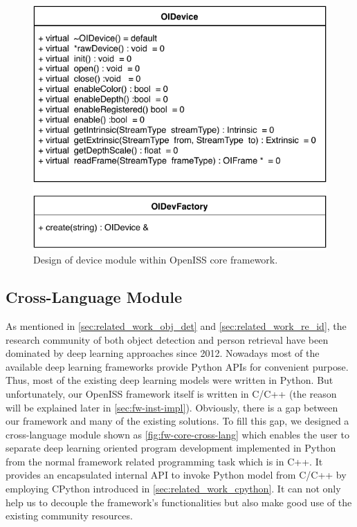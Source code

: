 \begin{figure}
    \centering
    \includegraphics[scale=0.8]{figures/framework_core_device.pdf}
    \caption{Design of device module within OpenISS core framework.}
    \label{fig:fw-core-device}
\end{figure}

\subsection{Cross-Language Module}
\label{sec:fw-design-core-cross-lang}

As mentioned in \autoref{sec:related_work_obj_det} and
\autoref{sec:related_work_re_id}, the research community of both 
object detection and person retrieval have been dominated by deep 
learning approaches since 2012.
Nowadays most of the available deep learning frameworks provide Python APIs for
convenient purpose. Thus, most of the existing deep learning models were 
written in Python. But unfortunately, our OpenISS framework itself is written 
in C/C++ (the reason will be explained later in \autoref{sec:fw-inst-impl}). 
Obviously, there is a gap between our framework and many of the existing 
solutions.
To fill this gap, we designed a cross-language module shown as
\autoref{fig:fw-core-cross-lang} which enables the user to separate 
deep learning oriented program development implemented in Python from 
the normal framework related programming task which is in C++.
It provides an encapsulated internal API to invoke Python model from C/C++ by 
employing CPython introduced in \autoref{sec:related_work_cpython}. It can not 
only help us to decouple the framework's functionalities but also make good use 
of the existing community resources. 

